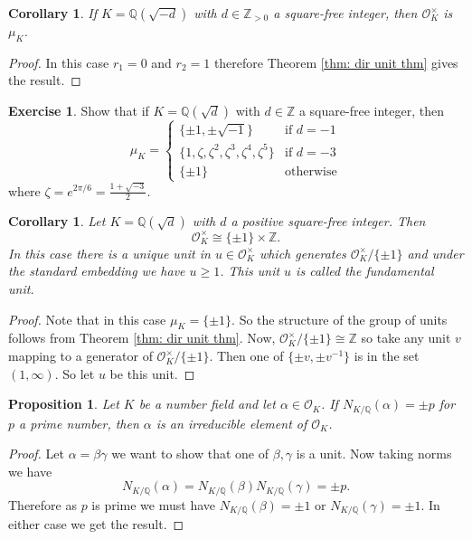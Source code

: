 \documentclass[11pt,a4paper]{report}
\theoremstyle{plain}
\newtheorem{cor}[subsection]{Corollary}
\newtheorem{prop}[subsection]{Proposition}
\theoremstyle{definition}
\theoremstyle{definition}
\newtheorem{question}[subsection]{Exercise}
\newcommand{\ZZ}{\mathbb{Z}}
\def\QQ{\mathbb{Q}}
\def \Nm {N_{K/\QQ}}
\def \a{\alpha}
\def \OO {\mathcal{O}}
\begin{document}
	\begin{cor}
		If $K=\QQ(\sqrt{-d})$ with $d \in \ZZ_{> 0}$ a square-free integer, then $\OO_K^\times$ is  $\mu_K$.
	\end{cor}
	
	\begin{proof}
		In this case $r_1=0$ and $r_2=1$ therefore Theorem \ref{thm: dir unit thm} gives the result.
	\end{proof}
	
	
	\begin{question}\label{ques: units in img quad}
		Show that if $K=\QQ(\sqrt{d})$ with $d \in \ZZ$ a square-free integer, then \[
		{\mu_K=} \begin{cases} \{\pm 1, \pm \sqrt{-1}\} & \text{if } d=-1\\
			\{1, \zeta, \zeta^2, \zeta^3, \zeta^4, \zeta^5  \} & \text{if } d=-3\\
			\{\pm 1\} & \text{otherwise}
		\end{cases}\]
		where $\zeta=e^{2\pi/6}=\frac{1+\sqrt{-3}}{2}$.
	\end{question}
	
	\begin{cor}
		Let $K=\QQ(\sqrt{d})$ with $d$ a positive square-free integer. Then \[\OO_K^{\times} \cong \{\pm 1\} \times \ZZ.\] In this case there is a unique unit in $u \in \OO_K^{\times}$ which generates $\OO_K^\times/ \{\pm 1\}$ and under the standard embedding we have $u \geq 1$. This unit $u$ is called the fundamental unit.
	\end{cor}
	
	\begin{proof}
		Note that in this case $\mu_K=\{\pm 1\}$. So the structure of the group of units follows from Theorem \ref{thm: dir unit thm}. Now, $\OO_{K}^{\times}/\{\pm 1\} \cong \ZZ$ so take any unit $v$ mapping to a generator of  $\OO_{K}^{\times}/\{\pm 1\}$. Then one of $\{\pm v, \pm v^{-1}\}$  is in the set $(1,\infty)$. So let $u$ be this unit.
	\end{proof}
	
	
	
	
	
	
	
	\begin{prop}
		Let $K$ be a number field and let $\a \in \OO_K$. If $N_{K/\QQ}(\a)=\pm p$ for $p$ a prime number, then $\a$ is an irreducible element of $\OO_K$.
	\end{prop}
	
	\begin{proof}
		Let $\a=\beta \gamma$ we want to show that one of $\beta,\gamma$ is a unit. Now taking norms we have \[\Nm(\a)=\Nm(\beta)\Nm(\gamma)=\pm p. \] Therefore as $p$ is prime we must have $\Nm(\beta)=\pm 1$ or $\Nm(\gamma)=\pm 1$. In either case we get the result. 
	\end{proof}
	
\end{document}
